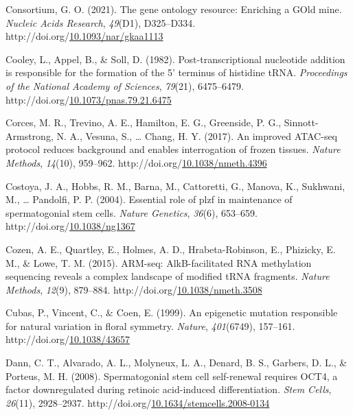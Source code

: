 \documentclass[12pt,twoside]{reedthesis}
\newlength{\cslhangindent}
\newenvironment{CSLReferences}[2] %
 {%
  \setlength{\parindent}{0pt}
  \ifodd #1 \everypar{\setlength{\hangindent}{\cslhangindent}}\ignorespaces\fi
  \ifnum #2 > 0
  \setlength{\parskip}{#2\baselineskip}
  \fi
 }%
 {}
\begin{document}
\begin{CSLReferences}{1}{0}
\leavevmode{}%
Consortium, G. O. (2021). The gene ontology resource: Enriching a GOld mine. \emph{Nucleic Acids Research}, \emph{49}(D1), D325--D334. http://doi.org/\href{https://doi.org/10.1093/nar/gkaa1113}{10.1093/nar/gkaa1113}

\leavevmode{}%
Cooley, L., Appel, B., \& Soll, D. (1982). Post-transcriptional nucleotide addition is responsible for the formation of the 5' terminus of histidine tRNA. \emph{Proceedings of the National Academy of Sciences}, \emph{79}(21), 6475--6479. http://doi.org/\href{https://doi.org/10.1073/pnas.79.21.6475}{10.1073/pnas.79.21.6475}

\leavevmode{}%
Corces, M. R., Trevino, A. E., Hamilton, E. G., Greenside, P. G., Sinnott-Armstrong, N. A., Vesuna, S., \ldots{} Chang, H. Y. (2017). An improved ATAC-seq protocol reduces background and enables interrogation of frozen tissues. \emph{Nature Methods}, \emph{14}(10), 959--962. http://doi.org/\href{https://doi.org/10.1038/nmeth.4396}{10.1038/nmeth.4396}

\leavevmode{}%
Costoya, J. A., Hobbs, R. M., Barna, M., Cattoretti, G., Manova, K., Sukhwani, M., \ldots{} Pandolfi, P. P. (2004). Essential role of plzf in maintenance of spermatogonial stem cells. \emph{Nature Genetics}, \emph{36}(6), 653--659. http://doi.org/\href{https://doi.org/10.1038/ng1367}{10.1038/ng1367}

\leavevmode{}%
Cozen, A. E., Quartley, E., Holmes, A. D., Hrabeta-Robinson, E., Phizicky, E. M., \& Lowe, T. M. (2015). ARM-seq: AlkB-facilitated RNA methylation sequencing reveals a complex landscape of modified tRNA fragments. \emph{Nature Methods}, \emph{12}(9), 879--884. http://doi.org/\href{https://doi.org/10.1038/nmeth.3508}{10.1038/nmeth.3508}

\leavevmode{}%
Cubas, P., Vincent, C., \& Coen, E. (1999). An epigenetic mutation responsible for natural variation in floral symmetry. \emph{Nature}, \emph{401}(6749), 157--161. http://doi.org/\href{https://doi.org/10.1038/43657}{10.1038/43657}

\leavevmode{}%
Dann, C. T., Alvarado, A. L., Molyneux, L. A., Denard, B. S., Garbers, D. L., \& Porteus, M. H. (2008). Spermatogonial stem cell self-renewal requires OCT4, a factor downregulated during retinoic acid-induced differentiation. \emph{Stem Cells}, \emph{26}(11), 2928--2937. http://doi.org/\href{https://doi.org/10.1634/stemcells.2008-0134}{10.1634/stemcells.2008-0134}


\end{CSLReferences}
\end{document}
